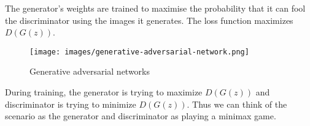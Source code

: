 \begin{onehalfspace}
    The generator's weights are trained to maximise the probability that it can 
    fool the discriminator using the images it generates. The loss function 
    maximizes \(D(G(z))\).

    \begin{figure}[h]
        \caption{Generative adversarial networks \cite{gan_image}}
        \centering
        \texttt{[image: images/generative-adversarial-network.png]}
    \end{figure} 

    During training, the generator is trying to maximize \(D(G(z))\) and 
    discriminator is trying to minimize \(D(G(z))\).  Thus we can think of the 
    scenario as the generator and discriminator as playing a minimax game.


\end{onehalfspace}

